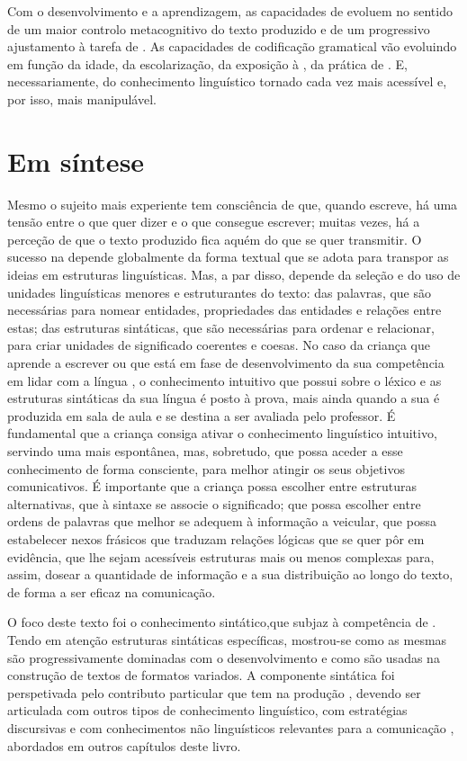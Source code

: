 \documentclass[output=paper]{LSP/langsci}
\begin{document}
Com o desenvolvimento e a aprendizagem, as capacidades de  evoluem no sentido de um maior controlo metacognitivo do texto produzido e de um progressivo ajustamento à tarefa de . As capacidades de codificação gramatical vão evoluindo em função da idade, da escolarização, da exposição à , da prática de . E, necessariamente, do conhecimento linguístico tornado cada vez mais acessível e, por isso, mais manipulável. 

\section{Em síntese}
\label{sec:costacostagoncalves_conclusao}

Mesmo o sujeito mais experiente tem consciência de que, quando escreve, há uma tensão entre o que quer dizer e o que consegue escrever; muitas vezes, há a perceção de que o texto produzido fica aquém do que se quer transmitir. O sucesso na  depende globalmente da forma textual que se adota para transpor as ideias em estruturas linguísticas. Mas, a par disso, depende da seleção e do uso de unidades linguísticas menores e estruturantes do texto: das palavras, que são necessárias para nomear entidades, propriedades das entidades e relações entre estas; das estruturas sintáticas, que são necessárias para ordenar e relacionar, para criar unidades de significado coerentes e coesas. No caso da criança que aprende a escrever ou que está em fase de desenvolvimento da sua competência em lidar com a língua , o conhecimento intuitivo que possui sobre o léxico e as estruturas sintáticas da sua língua é posto à prova, mais ainda quando a sua  é produzida em sala de aula e se destina a ser avaliada pelo professor. É fundamental que a criança consiga ativar o conhecimento linguístico intuitivo, servindo uma  mais espontânea, mas, sobretudo, que possa aceder a esse conhecimento de forma consciente, para melhor atingir os seus objetivos comunicativos. É importante que a criança possa escolher entre estruturas alternativas, que à sintaxe se associe o significado; que possa escolher entre ordens de palavras que melhor se adequem à informação a veicular, que possa estabelecer nexos frásicos que traduzam relações lógicas que se quer pôr em evidência, que lhe sejam acessíveis estruturas mais ou menos complexas para, assim, dosear a quantidade de informação e a sua distribuição ao longo do texto, de forma a ser eficaz na comunicação. 


O foco deste texto foi o conhecimento sintático,\largerpage[2] que subjaz à competência de . Tendo em atenção estruturas sintáticas específicas, mostrou-se como as mesmas são progressivamente dominadas com o desenvolvimento e como são usadas na construção de textos de formatos variados. A componente sintática foi perspetivada pelo contributo particular que tem na produção , devendo ser articulada com outros tipos de conhecimento linguístico, com estratégias discursivas e com conhecimentos não linguísticos relevantes para a comunicação , abordados em outros capítulos deste livro. 
\sloppy
\printbibliography[heading=subbibliography,notkeyword=this]
\end{document}
